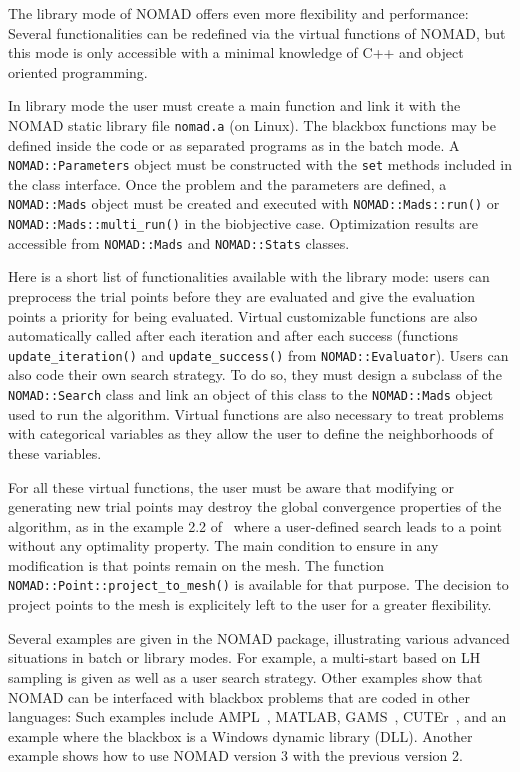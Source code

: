 \documentclass[12pt,english]{article}
\newcommand{\nomad}{NOMAD\xspace}
\newcommand{\bb}{blackbox\xspace}
\newcommand{\search}{{search}\xspace}
\begin{document}
The library mode of \nomad offers even more flexibility and performance:
     Several functionalities can be redefined via the virtual functions of \nomad, but
     this mode is only accessible with a minimal knowledge of C++
     and object oriented programming.

In library mode the user must create a main function and link
  it with the \nomad static library file \texttt{nomad.a} (on Linux).
The \bb functions may be defined inside the code or as separated programs as
  in the batch mode.
A \texttt{NOMAD::Parameters} object must
  be constructed with the \texttt{set} methods
  included in the class interface.
Once the problem and the parameters are defined, a \texttt{NOMAD::Mads}
  object must be created
  and executed with \texttt{NOMAD::Mads::run()} or
  \texttt{NOMAD::Mads::multi\_run()} in the
  biobjective case.
Optimization results are accessible from \texttt{NOMAD::Mads} and
  \texttt{NOMAD::Stats} classes.

Here is a short list of functionalities available with
     the library mode: %
     users can preprocess the trial points before they are evaluated
     and give the evaluation points a priority for being evaluated.
Virtual customizable functions are also automatically
  called after each iteration and after each success
  (functions \texttt{update\_iteration()}
    and \texttt{update\_success()} from \texttt{NOMAD::Evaluator}).
Users can also code their own \search strategy. %
  To do so, they must design a subclass of the \texttt{NOMAD::Search} class and
    link an object of this class to the \texttt{NOMAD::Mads} object used to
    run the algorithm.
Virtual functions are also necessary to treat problems
  with categorical variables as they allow the user to define
  the neighborhoods of these variables.

For all these virtual functions, the user must be aware that
  modifying or generating new trial points may destroy
  the global convergence properties of the algorithm,
  as in the example 2.2 of~\cite{AuLe09}
  where a user-defined search leads to a point
  without any optimality property.
The main condition to ensure in any modification is
  that points remain on the mesh.
The function \texttt{NOMAD::Point::project\_to\_mesh()}
  is available for that purpose.
The decision to project points to the mesh is explicitely left
  to the user for a greater flexibility.

 Several examples are given in the \nomad package, illustrating various
            advanced situations in batch or library modes.
  For example, a multi-start based on LH sampling is given as well as a
    user \search strategy.
  Other examples show that \nomad can be interfaced with \bb problems
    that are coded in other languages: Such examples include
    AMPL~\cite{FoGaKe03a},
    MATLAB, GAMS~\cite{BrKeMe88a}, CUTEr~\cite{GoOrTo03},
    and an example where the \bb is a Windows dynamic library (DLL).
  Another example shows how to use \nomad version 3 with the previous version 2.
\end{document}
